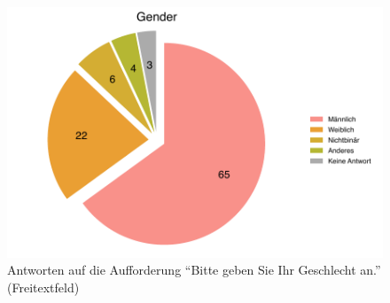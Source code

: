 \documentclass{scrartcl}
\begin{document}
\begin{figure}[t]
   \includegraphics[width=1\textwidth]{gender.pdf}
   \caption{Antworten auf die Aufforderung \enquote{Bitte geben Sie Ihr Geschlecht an.} (Freitextfeld)}
   \label{fig:gender}
\end{figure}
\end{document}
